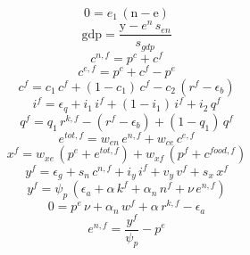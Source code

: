 \begin{dmath}
0={{e_{1}}}\, \left({{\mathrm{n}}}-{{\mathrm{e}}}\right)
\end{dmath}
\begin{dmath}
{{\mathrm{gdp}}}=\frac{{{\mathrm{y}}}-{{e^{n}}}\, {{s_{en}}}}{{{s_{gdp}}}}
\end{dmath}
\begin{dmath}
{{c^{n,f}}}={{p^{c}}}+{{c^{f}}}
\end{dmath}
\begin{dmath}
{{c^{e,f}}}={{p^{c}}}+{{c^{f}}}-{{p^{e}}}
\end{dmath}
\begin{dmath}
{{c^{f}}}={{c_{1}}}\, {{c^{f}}}+\left(1-{{c_{1}}}\right)\, {{c^{f}}}-{{c_{2}}}\, \left({{r^{f}}}-{{\epsilon_{b}}}\right)
\end{dmath}
\begin{dmath}
{{i^{f}}}={{\epsilon_{q}}}+{{i_{1}}}\, {{i^{f}}}+\left(1-{{i_{1}}}\right)\, {{i^{f}}}+{{i_{2}}}\, {{q^{f}}}
\end{dmath}
\begin{dmath}
{{q^{f}}}={{q_{1}}}\, {{r^{k,f}}}-\left({{r^{f}}}-{{\epsilon_{b}}}\right)+\left(1-{{q_{1}}}\right)\, {{q^{f}}}
\end{dmath}
\begin{dmath}
{{e^{tot,f}}}={{w_{en}}}\, {{e^{n,f}}}+{{w_{ce}}}\, {{c^{e,f}}}
\end{dmath}
\begin{dmath}
{{x^{f}}}={{w_{xe}}}\, \left({{p^{e}}}+{{e^{tot,f}}}\right)+{{w_{xf}}}\, \left({{p^{f}}}+{{c^{food,f}}}\right)
\end{dmath}
\begin{dmath}
{{y^{f}}}={{\epsilon_{g}}}+{{s_{n}}}\, {{c^{n,f}}}+{{i_{y}}}\, {{i^{f}}}+{{v_{y}}}\, {{v^{f}}}+{{s_{x}}}\, {{x^{f}}}
\end{dmath}
\begin{dmath}
{{y^{f}}}={{\psi_{p}}}\, \left({{\epsilon_{a}}}+{{\alpha}}\, {{k^{f}}}+{{\alpha_{n}}}\, {{n^{f}}}+{{\nu}}\, {{e^{n,f}}}\right)
\end{dmath}
\begin{dmath}
0={{p^{e}}}\, {{\nu}}+{{\alpha_{n}}}\, {{w^{f}}}+{{\alpha}}\, {{r^{k,f}}}-{{\epsilon_{a}}}
\end{dmath}
\begin{dmath}
{{e^{n,f}}}=\frac{{{y^{f}}}}{{{\psi_{p}}}}-{{p^{e}}}
\end{dmath}
